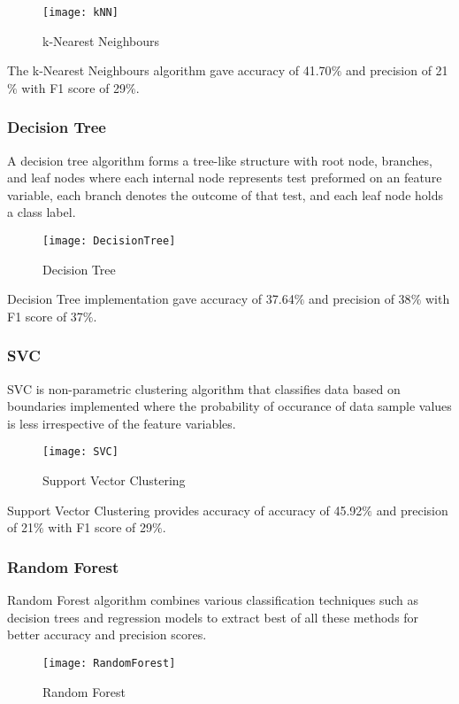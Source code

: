 \documentclass{acm_proc_article-sp}
\begin{document}
\begin{figure}[H]
\centering
\texttt{[image: kNN]}
\caption{k-Nearest Neighbours}
\end{figure}

The k-Nearest Neighbours algorithm gave accuracy of 41.70$\%$ and precision of 21$\%$ with F1 score of 29$\%$.

\subsubsection{Decision Tree}
A decision tree algorithm forms a tree-like structure with root node, branches, and leaf nodes where each internal node represents test preformed on an feature variable, each branch denotes the outcome of that test, and each leaf node holds a class label. 

\begin{figure}[H]
\centering
\texttt{[image: DecisionTree]}
\caption{Decision Tree}
\end{figure}

Decision Tree implementation gave accuracy of 37.64$\%$ and precision of 38$\%$ with F1 score of 37$\%$. 

\subsubsection{SVC}
SVC is non-parametric clustering algorithm that classifies data based on boundaries implemented where the probability of occurance of data sample values is less irrespective of the feature variables.

\begin{figure}[H]
\centering
\texttt{[image: SVC]}
\caption{Support Vector Clustering}
\end{figure}

Support Vector Clustering provides accuracy of accuracy of 45.92$\%$ and precision of 21$\%$ with F1 score of 29$\%$. 

\subsubsection{Random Forest}
Random Forest algorithm combines various classification techniques such as decision trees and regression models to extract best of all these methods for better accuracy and precision scores. 

\begin{figure}[H]
\centering
\texttt{[image: RandomForest]}
\caption{Random Forest}
\end{figure}
\end{document}
